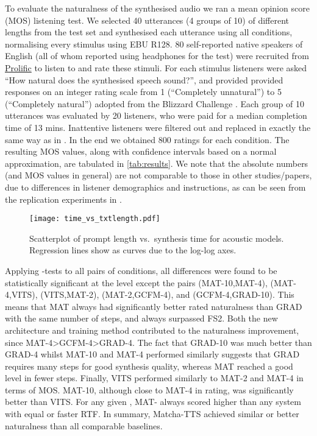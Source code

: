 \documentclass[british]{article}
\begin{document}
To evaluate the naturalness of the synthesised audio we ran a mean opinion score (MOS)
listening test.
We selected 40 utterances (4 groups of 10) of different lengths from the test set and synthesised each utterance using all conditions, normalising every stimulus
using EBU R128.
80 self-reported native speakers of English (all of whom reported using headphones for the test) were recruited from \href{https://prolific.co/}{Prolific} to listen to and rate these stimuli.
For each stimulus listeners were asked ``How natural does the synthesised speech sound?'', and provided provided responses on an integer rating scale from 1 (``Completely unnatural'') to 5 (``Completely natural'') adopted from the Blizzard Challenge \cite{prahallad2013blizzard}.
Each group of 10 utterances was evaluated by 20 listeners, who were paid  for a median completion time of 13 mins.
Inattentive listeners were filtered out and replaced in exactly the same way as in \cite{mehta2023overflow}.
In the end we obtained 800 ratings for each condition.
The resulting MOS values, along with confidence intervals based on a normal approximation, are tabulated in \cref{tab:results}.
We note that the absolute numbers (and MOS values in general) are not comparable to those in other studies/papers, due to differences in listener demographics and instructions, as can be seen from the replication experiments in \cite{chiang23why, kirkland2023stuck}.\begin{figure}[!t]
\centering
\texttt{[image: time\_vs\_txtlength.pdf]}
\caption{Scatterplot of prompt length vs.\ synthesis time for acoustic models. Regression lines show as curves due to the log-log axes.}
\label{fig: rtf slopes}
\vspace{-\baselineskip}
\end{figure}

Applying -tests to all pairs of conditions, all differences were found to be statistically significant at the  level except the pairs (MAT-10,MAT-4), (MAT-4,VITS), (VITS,MAT-2), (MAT-2,GCFM-4), and (GCFM-4,GRAD-10).
This means that MAT always had significantly better rated naturalness than GRAD with the same number of steps, and always surpassed FS2.
Both the new architecture and training method contributed to the naturalness improvement, since MAT-4>GCFM-4>GRAD-4.
The fact that GRAD-10 was much better than GRAD-4 whilst MAT-10 and MAT-4 performed similarly suggests that GRAD requires many steps for good synthesis quality, whereas MAT reached a good level in fewer steps.
Finally, VITS performed similarly to MAT-2 and MAT-4 in terms of MOS.
MAT-10, although close to MAT-4 in rating, was significantly better than VITS.
For any given , MAT- always scored higher than any system with equal or faster RTF.
In summary, Matcha-TTS achieved similar or better naturalness than all comparable baselines.
\end{document}
